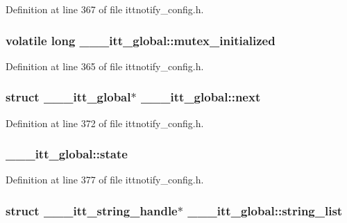 Definition at line 367 of file ittnotify\-\_\-config.\-h.

\hypertarget{struct______itt__global_a6c90634b5939d5718f63161edf0ee002}{
\subsubsection[{mutex\-\_\-initialized}]{\setlength{\rightskip}{0pt plus 5cm}volatile long \-\_\-\-\_\-\-\_\-itt\-\_\-global\-::mutex\-\_\-initialized}}\label{struct______itt__global_a6c90634b5939d5718f63161edf0ee002}


Definition at line 365 of file ittnotify\-\_\-config.\-h.

\hypertarget{struct______itt__global_ab664cd3d54752490af7e535d27d44763}{
\subsubsection[{next}]{\setlength{\rightskip}{0pt plus 5cm}struct {\bf \-\_\-\-\_\-\-\_\-itt\-\_\-global}$\ast$ \-\_\-\-\_\-\-\_\-itt\-\_\-global\-::next}}\label{struct______itt__global_ab664cd3d54752490af7e535d27d44763}


Definition at line 372 of file ittnotify\-\_\-config.\-h.

\hypertarget{struct______itt__global_af2a97fb07952dc430a28042e12732532}{
\subsubsection[{state}]{ \-\_\-\-\_\-\-\_\-itt\-\_\-global\-::state}}\label{struct______itt__global_af2a97fb07952dc430a28042e12732532}


Definition at line 377 of file ittnotify\-\_\-config.\-h.

\hypertarget{struct______itt__global_ab2f78024685f31d524cf848564bb24da}{
\subsubsection[{string\-\_\-list}]{\setlength{\rightskip}{0pt plus 5cm}struct \-\_\-\-\_\-\-\_\-itt\-\_\-string\-\_\-handle$\ast$ \-\_\-\-\_\-\-\_\-itt\-\_\-global\-::string\-\_\-list}}\label{struct______itt__global_ab2f78024685f31d524cf848564bb24da}


